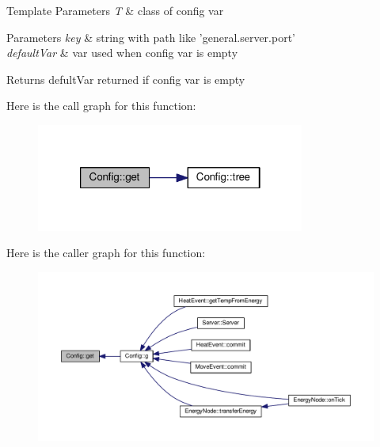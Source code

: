 \begin{DoxyTemplParams}{Template Parameters}
{\em T} & class of config var \\
\hline
\end{DoxyTemplParams}

\begin{DoxyParams}{Parameters}
{\em key} & string with path like 'general.\-server.\-port' \\
\hline
{\em default\-Var} & var used when config var is empty \\
\hline
\end{DoxyParams}
\begin{DoxyReturn}{Returns}
defult\-Var returned if config var is empty 
\end{DoxyReturn}


Here is the call graph for this function\-:
\nopagebreak
\begin{figure}[H]
\begin{center}
\leavevmode
\includegraphics[width=250pt]{class_config_a1f8e429f853f20cac7cf128f2b71543e_cgraph}
\end{center}
\end{figure}




Here is the caller graph for this function\-:
\nopagebreak
\begin{figure}[H]
\begin{center}
\leavevmode
\includegraphics[width=350pt]{class_config_a1f8e429f853f20cac7cf128f2b71543e_icgraph}
\end{center}
\end{figure}


